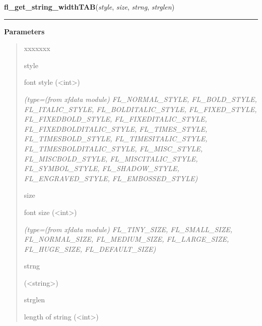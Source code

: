     \label{xformslib:library:fl_get_string_widthTAB}

    \vspace{0.5ex}

\hspace{.8\funcindent}\begin{boxedminipage}{\funcwidth}

    \raggedright \textbf{fl\_get\_string\_widthTAB}(\textit{style}, \textit{size}, \textit{strng}, \textit{strglen})

    \vspace{-1.5ex}

    \rule{\textwidth}{0.5\fboxrule}
\setlength{\parskip}{2ex}
\setlength{\parskip}{1ex}
      \textbf{Parameters}
      \vspace{-1ex}

      \begin{quote}
        \begin{Ventry}{xxxxxxx}

          \item[style]

          font style ({\textless}int{\textgreater})

            {\it (type=(from xfdata module) FL\_NORMAL\_STYLE, FL\_BOLD\_STYLE, FL\_ITALIC\_STYLE,
FL\_BOLDITALIC\_STYLE, FL\_FIXED\_STYLE, FL\_FIXEDBOLD\_STYLE, 
FL\_FIXEDITALIC\_STYLE, FL\_FIXEDBOLDITALIC\_STYLE, FL\_TIMES\_STYLE, 
FL\_TIMESBOLD\_STYLE, FL\_TIMESITALIC\_STYLE, FL\_TIMESBOLDITALIC\_STYLE, 
FL\_MISC\_STYLE, FL\_MISCBOLD\_STYLE, FL\_MISCITALIC\_STYLE, 
FL\_SYMBOL\_STYLE, FL\_SHADOW\_STYLE, FL\_ENGRAVED\_STYLE, 
FL\_EMBOSSED\_STYLE)}

          \item[size]

          font size ({\textless}int{\textgreater})

            {\it (type=(from xfdata module) FL\_TINY\_SIZE, FL\_SMALL\_SIZE, FL\_NORMAL\_SIZE, 
FL\_MEDIUM\_SIZE, FL\_LARGE\_SIZE, FL\_HUGE\_SIZE, FL\_DEFAULT\_SIZE)}

          \item[strng]

          ({\textless}string{\textgreater})

          \item[strglen]

          length of string ({\textless}int{\textgreater})


\end{Ventry}
\end{quote}
\end{boxedminipage}
